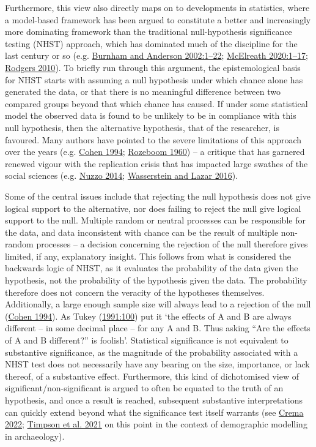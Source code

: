 \documentclass[
  12pt,
  a4paper,
  oneside]{book}
\begin{document}
Furthermore, this view also directly maps on to developments in statistics, where a model-based framework has been argued to constitute a better and increasingly more dominating framework than the traditional null-hypothesis significance testing (NHST) approach, which has dominated much of the discipline for the last century or so (e.g. \protect\hyperlink{ref-burnham2002}{Burnham and Anderson 2002:1--22}; \protect\hyperlink{ref-mcelreath2020}{McElreath 2020:1--17}; \protect\hyperlink{ref-rodgers2010}{Rodgers 2010}). To briefly run through this argument, the epistemological basis for NHST starts with assuming a null hypothesis under which chance alone has generated the data, or that there is no meaningful difference between two compared groups beyond that which chance has caused. If under some statistical model the observed data is found to be unlikely to be in compliance with this null hypothesis, then the alternative hypothesis, that of the researcher, is favoured. Many authors have pointed to the severe limitations of this approach over the years (e.g. \protect\hyperlink{ref-cohen1994}{Cohen 1994}; \protect\hyperlink{ref-rozeboom1960}{Rozeboom 1960}) -- a critique that has garnered renewed vigour with the replication crisis that has impacted large swathes of the social sciences (e.g. \protect\hyperlink{ref-nuzzo2014}{Nuzzo 2014}; \protect\hyperlink{ref-wasserstein2016}{Wasserstein and Lazar 2016}).

Some of the central issues include that rejecting the null hypothesis does not give logical support to the alternative, nor does failing to reject the null give logical support to the null. Multiple random or neutral processes can be responsible for the data, and data inconsistent with chance can be the result of multiple non-random processes -- a decision concerning the rejection of the null therefore gives limited, if any, explanatory insight. This follows from what is considered the backwards logic of NHST, as it evaluates the probability of the data given the hypothesis, not the probability of the hypothesis given the data. The probability therefore does not concern the veracity of the hypotheses themselves. Additionally, a large enough sample size will always lead to a rejection of the null (\protect\hyperlink{ref-cohen1994}{Cohen 1994}). As Tukey (\protect\hyperlink{ref-tukey1991}{1991:100}) put it `the effects of A and B are always different -- in some decimal place -- for any A and B. Thus asking ``Are the effects of A and B different?'' is foolish'. Statistical significance is not equivalent to substantive significance, as the magnitude of the probability associated with a NHST test does not necessarily have any bearing on the size, importance, or lack thereof, of a substantive effect. Furthermore, this kind of dichotomised view of significant/non-significant is argued to often be equated to the truth of an hypothesis, and once a result is reached, subsequent substantive interpretations can quickly extend beyond what the significance test itself warrants (see \protect\hyperlink{ref-crema2022}{Crema 2022}; \protect\hyperlink{ref-timpson2021}{Timpson et al. 2021} on this point in the context of demographic modelling in archaeology).
\end{document}
